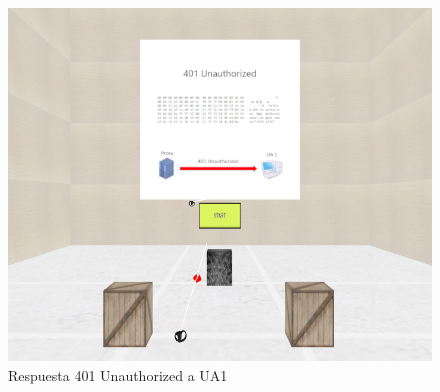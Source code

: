 \documentclass[a4paper, 12pt]{book}
\begin{document}
\begin{figure}
  \centering
  \includegraphics[width=12cm, keepaspectratio]{img/resultados/02-Unautorized.png}
  \caption{Respuesta 401 Unauthorized a UA1}
  \label{fig:02-Unautorized}
\end{figure}
\end{document}

